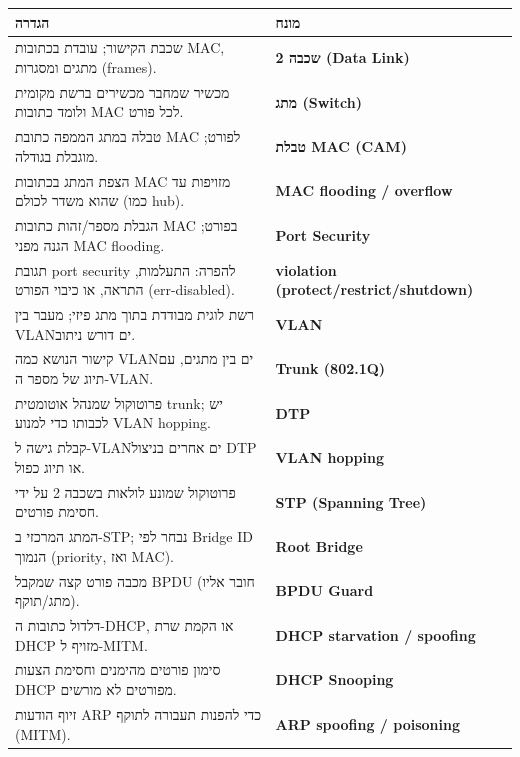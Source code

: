 \documentclass[11pt]{article}
\newcommand{\enLR}[1]{\textenglish{#1}}
\begin{document}
\begin{xltabular}{\linewidth}{|>{\setRTL\raggedleft\arraybackslash}X|>{\setRTL\raggedleft\arraybackslash}X|}
\hline
{}\textbf{הגדרה} & \textbf{מונח} \\
\hline
\endhead
שכבת הקישור; עובדת בכתובות \enLR{MAC}, מתגים ומסגרות \enLR{(frames).} & \textbf{שכבה \enLR{2 (Data Link)}} \\
\hline
מכשיר שמחבר מכשירים ברשת מקומית ולומד כתובות \enLR{MAC} לכל פורט. & \textbf{מתג \enLR{(Switch)}} \\
\hline
טבלה במתג הממפה כתובת \enLR{MAC} לפורט; מוגבלת בגודלה. & \textbf{טבלת \enLR{MAC (CAM)}} \\
\hline
הצפת המתג בכתובות \enLR{MAC} מזויפות עד שהוא משדר לכולם (כמו \enLR{hub).} & \textbf{\enLR{MAC flooding / overflow}} \\
\hline
הגבלת מספר/זהות כתובות \enLR{MAC} בפורט; הגנה מפני \enLR{MAC flooding.} & \textbf{\enLR{Port Security}} \\
\hline
תגובת \enLR{port security} להפרה: התעלמות, התראה, או כיבוי הפורט \enLR{(err-disabled).} & \textbf{\enLR{violation (protect/restrict/shutdown)}} \\
\hline
רשת לוגית מבודדת בתוך מתג פיזי; מעבר בין \enLR{VLAN}ים דורש ניתוב. & \textbf{\enLR{VLAN}} \\
\hline
קישור הנושא כמה \enLR{VLAN}ים בין מתגים, עם תיוג של מספר ה-\enLR{VLAN.} & \textbf{\enLR{Trunk (802.1Q)}} \\
\hline
פרוטוקול שמנהל אוטומטית \enLR{trunk}; יש לכבותו כדי למנוע \enLR{VLAN hopping.} & \textbf{\enLR{DTP}} \\
\hline
קבלת גישה ל-\enLR{VLAN}ים אחרים בניצול \enLR{DTP} או תיוג כפול. & \textbf{\enLR{VLAN hopping}} \\
\hline
פרוטוקול שמונע לולאות בשכבה \enLR{2} על ידי חסימת פורטים. & \textbf{\enLR{STP (Spanning Tree)}} \\
\hline
המתג המרכזי ב-\enLR{STP}; נבחר לפי \enLR{Bridge ID} הנמוך \enLR{(priority}, ואז \enLR{MAC).} & \textbf{\enLR{Root Bridge}} \\
\hline
מכבה פורט קצה שמקבל \enLR{BPDU} (חובר אליו מתג/תוקף). & \textbf{\enLR{BPDU Guard}} \\
\hline
דלדול כתובות ה-\enLR{DHCP}, או הקמת שרת \enLR{DHCP} מזויף ל-\enLR{MITM.} & \textbf{\enLR{DHCP starvation / spoofing}} \\
\hline
סימון פורטים מהימנים וחסימת הצעות \enLR{DHCP} מפורטים לא מורשים. & \textbf{\enLR{DHCP Snooping}} \\
\hline
זיוף הודעות \enLR{ARP} כדי להפנות תעבורה לתוקף \enLR{(MITM).} & \textbf{\enLR{ARP spoofing / poisoning}} \\

\end{xltabular}
\end{document}
